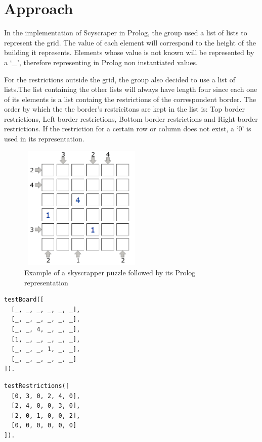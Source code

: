 \documentclass{llncs}
\begin{document}
%
\section{Approach}

In the implementation of Scyscraper in Prolog, the group used a list of lists to represent the grid. The value of each element will correspond to the height of the building it represents.
Elements whose value is not known will be represented by  a `\_', therefore representing in Prolog non instantiated values.

For the restrictions outside the grid, the group also decided to use a list of lists.The list containing the other lists will always have length four since each one of its elements is a list containg the restrictions of the correspondent border. The order by which the the border's restricitons are kept in the list is: Top border restrictions, Left border restrictions, Bottom border restrictions and Right border restrictions. If the restriction for a certain row or column does not exist, a `0' is used in its representation.

\begin{figure}[h!]
\begin{center}
\includegraphics[height=6cm,width=6cm]{images/example_skyscraper.png}
\caption{Example of a skyscrapper puzzle followed by its Prolog representation}
\label{Figure 3}
\end{center}
\end{figure}
\noindent\begin{minipage}{.48\textwidth}
\begin{lstlisting}[frame=tlrb, caption=Prolog grid representation]
testBoard([
  [_, _, _, _, _, _],
  [_, _, _, _, _, _],
  [_, _, 4, _, _, _],
  [1, _, _, _, _, _],
  [_, _, _, 1, _, _],
  [_, _, _, _, _, _]
]).
\end{lstlisting}
\end{minipage}\hfill
\begin{minipage}{.42\textwidth}
\begin{lstlisting}[frame=tblr, caption=Prolog representation of border restrictions]
testRestrictions([
  [0, 3, 0, 2, 4, 0],
  [2, 4, 0, 0, 3, 0],
  [2, 0, 1, 0, 0, 2],
  [0, 0, 0, 0, 0, 0]
]).
\end{lstlisting}
\end{minipage}\hfill
\end{document}
